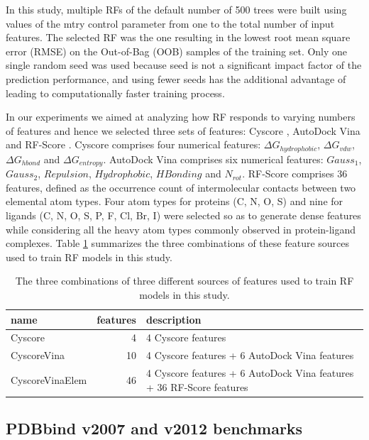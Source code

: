 \documentclass[journal=jacsat,manuscript=article]{achemso}
\begin{document}
In this study, multiple RFs of the default number of 500 trees were built using values of the mtry control parameter from one to the total number of input features. The selected RF was the one resulting in the lowest root mean square error (RMSE) on the Out-of-Bag (OOB) samples of the training set. Only one single random seed was used because seed is not a significant impact factor of the prediction performance, and using fewer seeds has the additional advantage of leading to computationally faster training process.

In our experiments we aimed at analyzing how RF responds to varying numbers of features and hence we selected three sets of features: Cyscore \cite{1372}, AutoDock Vina \cite{595} and RF-Score \cite{564}. Cyscore comprises four numerical features: $\Delta G_{hydrophobic}$, $\Delta G_{vdw}$, $\Delta G_{hbond}$ and $\Delta G_{entropy}$. AutoDock Vina comprises six numerical features: $Gauss_1$, $Gauss_2$, $Repulsion$, $Hydrophobic$, $HBonding$ and $N_{rot}$. RF-Score comprises 36 features, defined as the occurrence count of intermolecular contacts between two elemental atom types. Four atom types for proteins (C, N, O, S) and nine for ligands (C, N, O, S, P, F, Cl, Br, I) were selected so as to generate dense features while considering all the heavy atom types commonly observed in protein-ligand complexes. Table \ref{tbl:features} summarizes the three combinations of these feature sources used to train RF models in this study. %

\begin{table}[h]
\caption{The three combinations of three different sources of features used to train RF models in this study.}
\label{tbl:features}
\begin{tabular}{lrl}
\hline
name & features & description\\
\hline
Cyscore         &  4 & 4 Cyscore features\\
CyscoreVina     & 10 & 4 Cyscore features + 6 AutoDock Vina features\\
CyscoreVinaElem & 46 & 4 Cyscore features + 6 AutoDock Vina features + 36 RF-Score features\\
\hline
\end{tabular}
\end{table}

\subsection{PDBbind v2007 and v2012 benchmarks}
\end{document}
